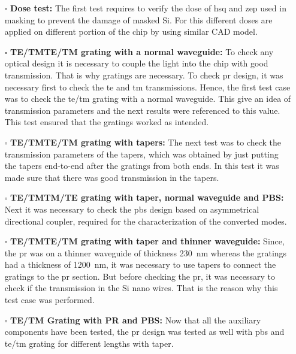 \documentclass[../report.tex]{subfiles}
\begin{document}
\begin{itemize}[leftmargin=*]
	\item[$\square$] \textbf{Dose test:} The first test requires to verify the dose of \gls{hsq} and \gls{zep} used in masking to prevent the damage of masked Si. For this different doses are applied on different portion of the chip by using similar CAD model.
			
	\item[$\square$] \textbf{TE/TM\textemdash TE/TM grating with a normal waveguide:} To check any optical design it is necessary to couple the light into the chip with good transmission. That is why gratings are necessary. To check \gls{pr} design, it was necessary first to check the \gls{te} and \gls{tm} transmissions. Hence, the first test case was to check the \gls{te}/\gls{tm} grating with a normal waveguide. This give an idea of transmission parameters and the next results were referenced to this value. This test ensured that the gratings worked as intended. 
	
	\item[$\square$] \textbf{TE/TM\textemdash TE/TM grating with tapers:} The next test was to check the transmission parameters of the tapers, which was obtained by just putting the tapers end-to-end after the gratings from both ends. In this test it was made sure that there was good transmission in the tapers.
	
	\item[$\square$] \textbf{TE/TM\textemdash TM/TE grating with taper, normal waveguide and PBS:} Next it was necessary to check the \gls{pbs} design based on asymmetrical directional coupler, required for the characterization of the converted modes.
	
	\item[$\square$] \textbf{TE/TM\textemdash TE/TM grating with taper and thinner waveguide:} Since, the \gls{pr} was on a thinner waveguide of thickness \SI{230}{\nano \meter} whereas the gratings had a thickness of \SI{1200}{\nano \meter}, it was necessary to use tapers to connect the gratings to the \gls{pr} section. But before checking the \gls{pr}, it was necessary to check if the transmission in the Si nano wires. That is the reason why this test case was performed. 
	
	\item[$\square$] \textbf{TE/TM Grating with PR and PBS:} Now that all the auxiliary components have been tested, the \gls{pr} design was tested as well with \gls{pbs} and \gls{te}/\gls{tm} grating for different lengths with taper.
	

\end{itemize}
\end{document}
